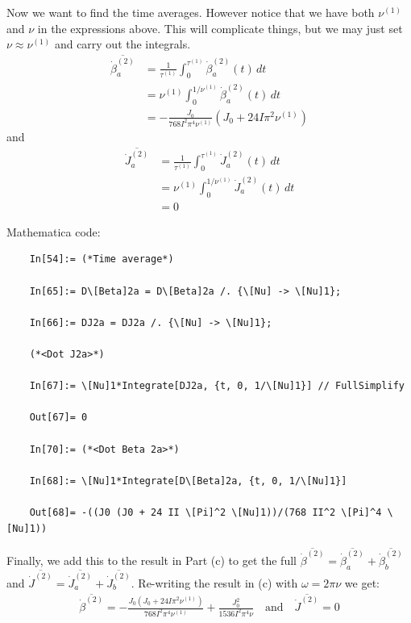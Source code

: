 \documentclass{article}
\theoremstyle{definition}
\newcommand{\be}{\beta}
\newcommand{\f}[2]{\frac{#1}{#2}}
\begin{document}
\begin{enumerate}[label=(\alph*)]
	Now we want to find the time averages. However notice that we have both $\nu^{(1)}$ and $\nu$ in the expressions above. This will complicate things, but we may just set $\nu \approx \nu^{(1)}$ and carry out the integrals. 
	\begin{align*}
	\overline{\dot \be_a^{(2)}} 
	&= \f{1}{\tau^{(1)}}\int_0^{\tau^{(1)}} \dot \be_a^{(2)}(t) \,dt\\
	&= \nu^{(1)} \int_0^{1/\nu^{(1)}}   \dot \be_a^{(2)}(t) \,dt\\ 
	&= \boxed{-\f{J_0 }{768 I^2 \pi^4 \nu^{(1)}}(J_0 + 24 I \pi^2 \nu^{(1)})}
	\end{align*}
	and 
	\begin{align*}
	\overline{\dot J_a^{(2)}} 
	&= \f{1}{\tau^{(1)}}\int_0^{\tau^{(1)}} \dot J_a^{(2)}(t) \,dt\\
	&= \nu^{(1)} \int_0^{1/\nu^{(1)}}   \dot J_a^{(2)}(t) \,dt\\ 
	&= \boxed{0}
	\end{align*}
	
	Mathematica code:
	\begin{lstlisting}
	In[54]:= (*Time average*)
	
	In[65]:= D\[Beta]2a = D\[Beta]2a /. {\[Nu] -> \[Nu]1};
	
	In[66]:= DJ2a = DJ2a /. {\[Nu] -> \[Nu]1};
	
	(*<Dot J2a>*)
	
	In[67]:= \[Nu]1*Integrate[DJ2a, {t, 0, 1/\[Nu]1}] // FullSimplify
	
	Out[67]= 0
	
	In[70]:= (*<Dot Beta 2a>*)
	
	In[68]:= \[Nu]1*Integrate[D\[Beta]2a, {t, 0, 1/\[Nu]1}]
	
	Out[68]= -((J0 (J0 + 24 II \[Pi]^2 \[Nu]1))/(768 II^2 \[Pi]^4 \[Nu]1))
	\end{lstlisting}
	
	
	Finally, we add this to the result in Part (c) to get the full $\overline{\dot\be^{(2)}} = \overline{\dot\be_a^{(2)}} + \overline{\dot\be_b^{(2)}}$ and $\overline{\dot J^{(2)}} = \overline{\dot  J_a^{(2)}} + \overline{\dot J_b^{(2)}}$. Re-writing the result in (c) with $\omega = 2\pi \nu$ we get:
	\begin{align*}
	\boxed{\overline{\dot\be^{(2)}} = -\f{J_0 (J_0 + 24 I \pi^2 \nu^{(1)}) }{768 I^2 \pi^4 \nu^{(1)}} + \f{J_0^2}{1536 I^2 \pi^4 \nu}} \quad\text{and} \quad \boxed{\overline{\dot J^{(2)}} = 0}
	\end{align*}
	
	
	
\end{enumerate}
\end{document}

